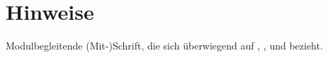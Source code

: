 \section*{Hinweise}
Modulbegleitende (Mit-)Schrift, die sich überwiegend auf \cite{Wed09}, \cite{Wed09b}, \cite{Buh09} und \cite{Wed09c} bezieht.